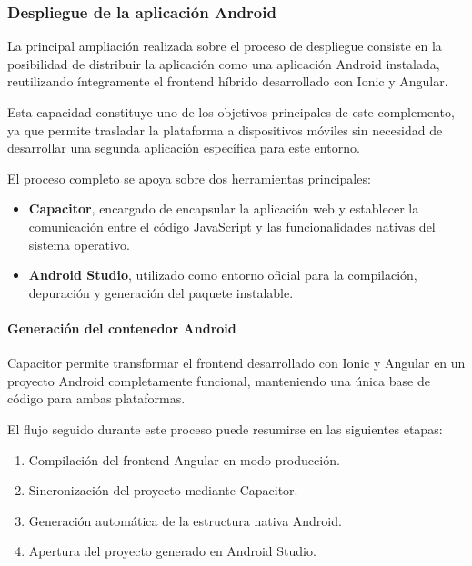 \subsubsection{Despliegue de la aplicación Android}

La principal ampliación realizada sobre el proceso de despliegue consiste en la posibilidad de distribuir la aplicación como una aplicación Android instalada, reutilizando íntegramente el frontend híbrido desarrollado con Ionic y Angular.

Esta capacidad constituye uno de los objetivos principales de este complemento, ya que permite trasladar la plataforma a dispositivos móviles sin necesidad de desarrollar una segunda aplicación específica para este entorno.

El proceso completo se apoya sobre dos herramientas principales:

\begin{itemize}
    \item \textbf{Capacitor}, encargado de encapsular la aplicación web y establecer la comunicación entre el código JavaScript y las funcionalidades nativas del sistema operativo.

    \item \textbf{Android Studio}, utilizado como entorno oficial para la compilación, depuración y generación del paquete instalable.
\end{itemize}

\paragraph{Generación del contenedor Android}

Capacitor permite transformar el frontend desarrollado con Ionic y Angular en un proyecto Android completamente funcional, manteniendo una única base de código para ambas plataformas.

El flujo seguido durante este proceso puede resumirse en las siguientes etapas:

\begin{enumerate}
    \item Compilación del frontend Angular en modo producción.
    \item Sincronización del proyecto mediante Capacitor.
    \item Generación automática de la estructura nativa Android.
    \item Apertura del proyecto generado en Android Studio.
\end{enumerate}

